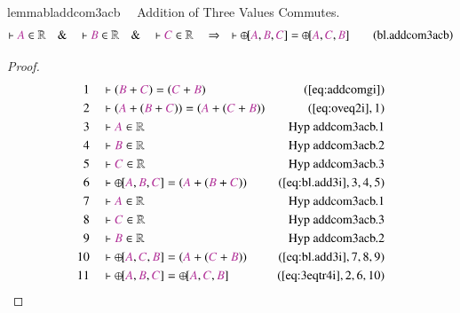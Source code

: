 \begin{restatable}{lemma}{bladdcom3acb}~~ Addition of Three Values Commutes.
\begin{align}
\vdash \mc{A} \in \mathbb{R}\quad\&\quad \vdash \mc{B} \in
    \mathbb{R}\quad\&\quad \vdash \mc{C} \in \mathbb{R}\quad\Rightarrow\quad
    \vdash {\oplus\hspace{-1pt}[} \mc{A} , \mc{B} , \mc{C} ] =
    {\oplus\hspace{-1pt}[} \mc{A} , \mc{C} , \mc{B}
    ]\label{eq:bl.addcom3acb}\tag{bl.addcom3acb}
\end{align}
\end{restatable}

\begin{proof}
\begin{align}
  1 &&  & \vdash ( \mc{B} + \mc{C} ) = ( \mc{C} + \mc{B}
      )&(\mbox{\ref{eq:addcomgi}})\notag
  \\ 2 &&  & \vdash ( \mc{A} + ( \mc{B} + \mc{C} ) ) = ( \mc{A} + ( \mc{C} +
      \mc{B} ) )&(\mbox{\ref{eq:oveq2i}},1)\notag
  \\ 3 &&  & \vdash \mc{A} \in
\mathbb{R}&\text{Hyp~addcom3acb.1}\notag%
  \\ 4 &&  & \vdash \mc{B} \in
\mathbb{R}&\text{Hyp~addcom3acb.2}\notag%
  \\ 5 &&  & \vdash \mc{C} \in
\mathbb{R}&\text{Hyp~addcom3acb.3}\notag%
  \\ 6 &&  & \vdash {\oplus\hspace{-1pt}[} \mc{A} , \mc{B} , \mc{C} ] = (
      \mc{A} + ( \mc{B} + \mc{C} )
      )&(\mbox{\ref{eq:bl.add3i}},3,4,5)\notag
  \\ 7 &&  & \vdash \mc{A} \in
\mathbb{R}&\text{Hyp~addcom3acb.1}\notag%
  \\ 8 &&  & \vdash \mc{C} \in
\mathbb{R}&\text{Hyp~addcom3acb.3}\notag%
  \\ 9 &&  & \vdash \mc{B} \in
\mathbb{R}&\text{Hyp~addcom3acb.2}\notag%
  \\ 10 &&  & \vdash {\oplus\hspace{-1pt}[} \mc{A} , \mc{C} , \mc{B} ] = (
      \mc{A} + ( \mc{C} + \mc{B} )
      )&(\mbox{\ref{eq:bl.add3i}},7,8,9)\notag
  \\ 11 &&  & \vdash {\oplus\hspace{-1pt}[} \mc{A} , \mc{B} , \mc{C} ] =
      {\oplus\hspace{-1pt}[} \mc{A} , \mc{C} , \mc{B}
      ]&(\mbox{\ref{eq:3eqtr4i}},2,6,10)\notag
\end{align}
\end{proof}

